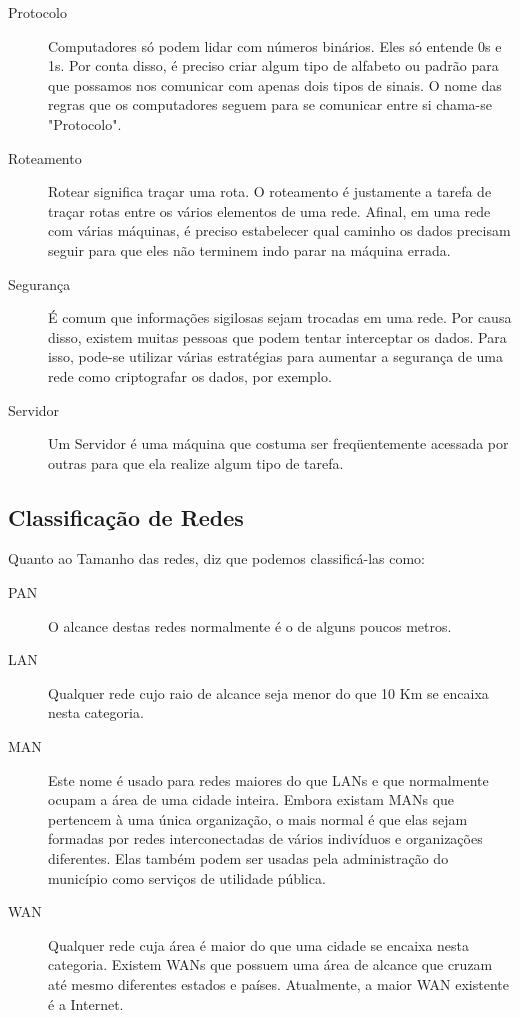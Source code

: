 \begin{description}
		\item[Protocolo] Computadores só podem lidar com números binários. Eles só entende 0s e 1s. Por conta disso, é preciso criar algum tipo de alfabeto ou padrão para que possamos nos comunicar com apenas dois tipos de sinais. O nome das regras que os computadores seguem para se comunicar entre si chama-se "Protocolo".
		\item[Roteamento] Rotear significa traçar uma rota. O roteamento é justamente a tarefa de traçar rotas entre os vários elementos de uma rede. Afinal, em uma rede com várias máquinas, é preciso estabelecer qual caminho os dados precisam seguir para que eles não terminem indo parar na máquina errada.
		\item[Segurança] É comum que informações sigilosas sejam trocadas em uma rede. Por causa disso, existem muitas pessoas que podem tentar interceptar os dados. Para isso, pode-se utilizar várias estratégias para aumentar a segurança de uma rede como criptografar os dados, por exemplo.
		\item[Servidor] Um Servidor é uma máquina que costuma ser freqüentemente acessada por outras para que ela realize algum tipo de tarefa.
	\end{description}

	\subsection{Classificação de Redes}
	Quanto ao Tamanho das redes, \cite{ross2009redes} diz que podemos classificá-las como:
	\begin{description}
		\item[PAN] O alcance destas redes normalmente é o de alguns poucos metros.
		\item[LAN] Qualquer rede cujo raio de alcance seja menor do que 10 Km se encaixa nesta categoria.
		\item[MAN] Este nome é usado para redes maiores do que LANs e que normalmente ocupam a área de uma cidade inteira. Embora existam MANs que pertencem à uma única organização, o mais normal é que elas sejam formadas por redes interconectadas de vários indivíduos e organizações diferentes. Elas também podem ser usadas pela administração do município como serviços de utilidade pública.
		\item[WAN] Qualquer rede cuja área é maior do que uma cidade se encaixa nesta categoria. Existem WANs que possuem uma área de alcance que cruzam até mesmo diferentes estados e países. Atualmente, a maior WAN existente é a Internet.
	\end{description}

